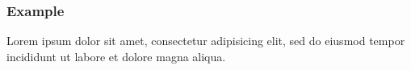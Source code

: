 \begin{frame}\frametitle{Example}

\begin{example}
Lorem ipsum dolor sit amet, consectetur adipisicing elit, sed do eiusmod tempor incididunt ut labore et dolore magna aliqua.
\end{example} 

\end{frame}